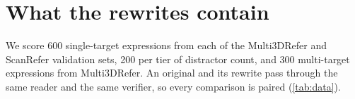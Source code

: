 \section{What the rewrites contain}
\label{sec:data}

We score 600 single-target expressions from each of the Multi3DRefer and ScanRefer validation sets, 200 per tier of distractor count, and 300 multi-target expressions from Multi3DRefer.
An original and its rewrite pass through the same reader and the same verifier, so every comparison is paired (\cref{tab:data}).

